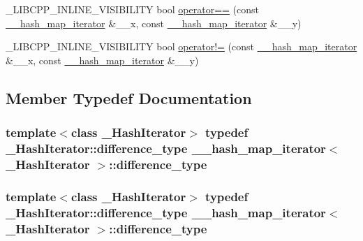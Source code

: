 \begin{DoxyCompactItemize}
\item 
\+\_\+\+L\+I\+B\+C\+P\+P\+\_\+\+I\+N\+L\+I\+N\+E\+\_\+\+V\+I\+S\+I\+B\+I\+L\+I\+T\+Y bool \hyperlink{class____hash__map__iterator_a5534d558226d3cceed535b5cbe70a0f1}{operator==} (const \hyperlink{class____hash__map__iterator}{\+\_\+\+\_\+hash\+\_\+map\+\_\+iterator} \&\+\_\+\+\_\+x, const \hyperlink{class____hash__map__iterator}{\+\_\+\+\_\+hash\+\_\+map\+\_\+iterator} \&\+\_\+\+\_\+y)
\item 
\+\_\+\+L\+I\+B\+C\+P\+P\+\_\+\+I\+N\+L\+I\+N\+E\+\_\+\+V\+I\+S\+I\+B\+I\+L\+I\+T\+Y bool \hyperlink{class____hash__map__iterator_a47c549da239ab29cc2ac7a7c1efbdc91}{operator!=} (const \hyperlink{class____hash__map__iterator}{\+\_\+\+\_\+hash\+\_\+map\+\_\+iterator} \&\+\_\+\+\_\+x, const \hyperlink{class____hash__map__iterator}{\+\_\+\+\_\+hash\+\_\+map\+\_\+iterator} \&\+\_\+\+\_\+y)
\end{DoxyCompactItemize}


\subsection{Member Typedef Documentation}
\hypertarget{class____hash__map__iterator_a2d6975541434b3c350bc11345210319a}{}
\subsubsection[{difference\+\_\+type}]{\setlength{\rightskip}{0pt plus 5cm}template$<$class \+\_\+\+Hash\+Iterator$>$ typedef \+\_\+\+Hash\+Iterator\+::difference\+\_\+type {\bf \+\_\+\+\_\+hash\+\_\+map\+\_\+iterator}$<$ \+\_\+\+Hash\+Iterator $>$\+::{\bf difference\+\_\+type}}\label{class____hash__map__iterator_a2d6975541434b3c350bc11345210319a}
\hypertarget{class____hash__map__iterator_a2d6975541434b3c350bc11345210319a}{}
\subsubsection[{difference\+\_\+type}]{\setlength{\rightskip}{0pt plus 5cm}template$<$class \+\_\+\+Hash\+Iterator$>$ typedef \+\_\+\+Hash\+Iterator\+::difference\+\_\+type {\bf \+\_\+\+\_\+hash\+\_\+map\+\_\+iterator}$<$ \+\_\+\+Hash\+Iterator $>$\+::{\bf difference\+\_\+type}}\label{class____hash__map__iterator_a2d6975541434b3c350bc11345210319a}
\hypertarget{class____hash__map__iterator_a82c25b4c3cbb1ea424ffae9832716982}{}
